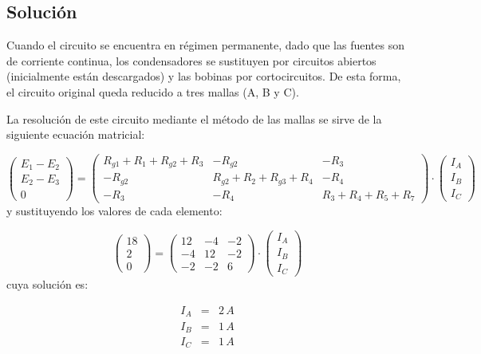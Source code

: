 \documentclass[10pt]{article}
\begin{document}
\subsection*{Solución}

Cuando el circuito se encuentra en régimen permanente, dado que las
fuentes son de corriente continua, los condensadores se sustituyen
por circuitos abiertos (inicialmente están descargados) y las bobinas
por cortocircuitos. De esta forma, el circuito original queda reducido
a tres mallas (A, B y C).

La resolución de este circuito mediante el método de las mallas se
sirve de la siguiente ecuación matricial:

\[
\left(\begin{array}{c}
E_{1}-E_{2}\\
E_{2}-E_{3}\\
0
\end{array}\right) = \left(\begin{array}{ccc}
R_{g1}+R_{1}+R_{g2}+R_{3} & -R_{g2} & -R_{3}\\
-R_{g2} & R_{g2}+R_{2}+R_{g3}+R_{4} & -R_{4}\\
-R_{3} & -R_{4} & R_{3}+R_{4}+R_{5}+R_{7}
\end{array}\right) \cdot \left(\begin{array}{c}
I_{A}\\
I_{B}\\
I_{C}
\end{array}\right)
\]
 y sustituyendo los valores de cada elemento:

\[
\left(\begin{array}{c}
18\\
2\\
0
\end{array}\right) = \left(\begin{array}{ccc}
12 & -4 & -2\\
-4 & 12 & -2\\
-2 & -2 & 6
\end{array}\right) \cdot \left(\begin{array}{c}
I_{A}\\
I_{B}\\
I_{C}
\end{array}\right)
\]
cuya solución es:

\begin{eqnarray*}
I_{A} & = & 2\, A\\
I_{B} & = & 1\, A\\
I_{C} & = & 1\, A
\end{eqnarray*}
\end{document}
